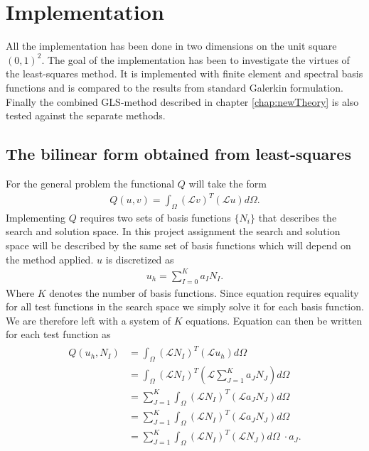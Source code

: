 
\chapter{Implementation} %

\label{chap:Implementation} %



All the implementation has been done in two dimensions on the unit square $(0,1)^2$. The goal of the implementation has been to investigate the virtues of the least-squares method. It is implemented with finite element and spectral basis functions and is compared to the results from standard Galerkin formulation. Finally the combined GLS-method described in chapter \ref{chap:newTheory} is also tested against the separate methods. \section{The bilinear form obtained from least-squares}
 For the general problem the functional $Q$ will take the form 
\begin{align}
	Q(u,v)=\int_{\Omega}(\mathcal{L}v)^T(\mathcal{L}u)d\Omega.
	\label{eq:functionalInt}
\end{align}
Implementing $Q$ requires two sets of basis functions $\{N_i\}$ that describes the search and solution space. In this project assignment the search and solution space will be described by the same set of basis functions which will depend on the method applied. $u$ is discretized as 
\begin{align}
	u_h = \sum_{I=0}^{K}a_IN_I.
	\label{eq:uDisc}
\end{align}
Where $K$ denotes the number of basis functions. Since equation requires equality for all test functions in the search space we simply solve it for each basis function. We are therefore left with a system of $K$ equations. Equation can then be written for each test function as  
\begin{align}
	\begin{split}
	Q(u_h,N_I) &= \int_{\Omega}(\mathcal{L}N_I)^T(\mathcal{L}u_h)d\Omega \\
	&= \int_{\Omega}(\mathcal{L}N_I)^T(\mathcal{L}\sum_{J=1}^Ka_JN_J)d\Omega \\
	&= \sum_{J=1}^K\int_{\Omega}(\mathcal{L}N_I)^T(\mathcal{L}a_JN_J)d\Omega \\
	&= \sum_{J=1}^K\int_{\Omega}(\mathcal{L}N_I)^T(\mathcal{L}a_JN_J)d\Omega \\
	&= \sum_{J=1}^K\int_{\Omega}(\mathcal{L}N_I)^T(\mathcal{L}N_J)d\Omega \;\cdot a_J.
	\end{split}
	\label{eq:varFormDisc}
\end{align}
